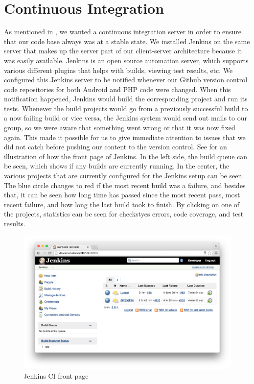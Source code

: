 \section{Continuous Integration}
\label{sec:continuous_integration}
As mentioned in , we wanted a continuous integration server in order to ensure that our code base always was at a stable state. We installed Jenkins on the same server that makes up the server part of our client-server architecture because it was easily available. Jenkins is an open source automation server, which supports various different plugins that helps with builds, viewing test results, etc. We configured this Jenkins server to be notified whenever our Github version control code repositories for both Android and PHP code were changed. When this notification happened, Jenkins would build the corresponding project and run its tests. Whenever the build projects would go from a previously successful build to a now failing build or vice versa, the Jenkins system would send out mails to our group, so we were aware that something went wrong or that it was now fixed again. This made it possible for us to give immediate attention to issues that we did not catch before pushing our content to the version control. See  for an illustration of how the front page of Jenkins. In the left side, the build queue can be seen, which shows if any builds are currently running. In the center, the various projects that are currently configured for the Jenkins setup can be seen. The blue circle changes to red if the most recent build was a failure, and besides that, it can be seen how long time has passed since the most recent pass, most recent failure, and how long the last build took to finish. By clicking on one of the projects, statistics can be seen for checkstyes errors, code coverage, and test results. 

\begin{figure}[!htbp]
    \centering
    \includegraphics[width=\textwidth]{graphic/quality_assurance/jenkins_frontpage.png}
    \caption{Jenkins CI front page}
    \label{fig:jenkins_front_page}
\end{figure}
\FloatBarrier

